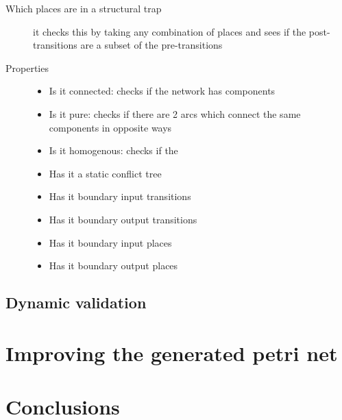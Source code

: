 \documentclass[12pt,a4paper,draft]{article}
\begin{document}
\begin{description}
    \item [Which places are in a structural trap] it checks this by taking any combination of places and sees if the post-transitions are a subset of the pre-transitions
    
    \item [Properties]
    
    \begin{itemize}
        \item Is it connected: checks if the network has components
        \item Is it pure: checks if there are 2 arcs which connect the same components in opposite ways
        \item Is it homogenous: checks if the 
        \item Has it a static conflict tree
        \item Has it boundary input transitions
        \item Has it boundary output transitions
        \item Has it boundary input places
        \item Has it boundary output places
    \end{itemize}
    
    \end{description}
    

\subsection{Dynamic validation}\label{sec:dynamic_validation}

\section{Improving the generated petri net}\label{sec:improvments}


\section{Conclusions}\label{sec:conclusions}
    
\end{document}
